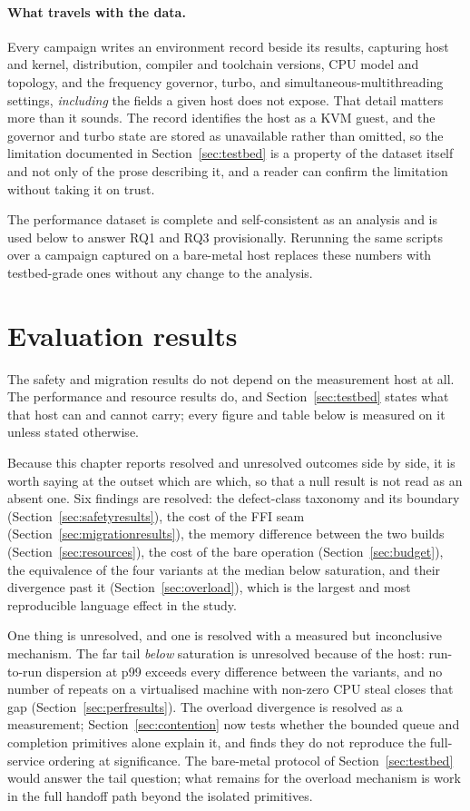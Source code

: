\documentclass[english,twoside,openright,a4paper,censored,csm,software-track-2020]{HYthesisML}
\begin{document}
\paragraph{What travels with the data.}
Every campaign writes an environment record beside its results, capturing host and kernel,
distribution, compiler and toolchain versions, CPU model and topology, and the frequency
governor, turbo, and simultaneous-multithreading settings, \emph{including} the fields a given
host does not expose. That detail matters more than it sounds. The record identifies the host as a
KVM guest, and the governor and turbo state are stored as unavailable rather than omitted, so the
limitation documented in Section~\ref{sec:testbed} is a property of the dataset itself and not only of the prose
describing it, and a reader can confirm the limitation without taking it on trust.

The performance dataset is complete and self-consistent as an analysis and is used below to
answer RQ1 and RQ3 provisionally. Rerunning the same scripts over a campaign captured on a
bare-metal host replaces these numbers with testbed-grade ones without any change to the
analysis.

\section{Evaluation results}
The safety and migration results do not depend on the measurement host at all. The performance and
resource results do, and Section~\ref{sec:testbed} states what that host can and cannot carry;
every figure and table below is measured on it unless stated otherwise.

Because this chapter reports resolved and unresolved outcomes side by side, it is worth saying at
the outset which are which, so that a null result is not read as an absent one. Six findings are
resolved: the defect-class taxonomy and its boundary (Section~\ref{sec:safetyresults}), the cost
of the FFI seam (Section~\ref{sec:migrationresults}), the memory difference between the two builds
(Section~\ref{sec:resources}), the cost of the bare operation (Section~\ref{sec:budget}), the
equivalence of the four variants at the median below saturation, and their divergence past it
(Section~\ref{sec:overload}), which is the largest and most reproducible language effect in the
study.

One thing is unresolved, and one is resolved with a measured but inconclusive mechanism. The far
tail \emph{below} saturation is unresolved because of the host: run-to-run dispersion at p99
exceeds every difference between the variants, and no number of repeats on a virtualised machine
with non-zero CPU steal closes that gap (Section~\ref{sec:perfresults}). The overload divergence
is resolved as a measurement; Section~\ref{sec:contention} now tests whether the bounded queue and
completion primitives alone explain it, and finds they do not reproduce the full-service ordering
at significance. The bare-metal protocol of Section~\ref{sec:testbed} would answer the tail
question; what remains for the overload mechanism is work in the full handoff path beyond the
isolated primitives.
\end{document}
